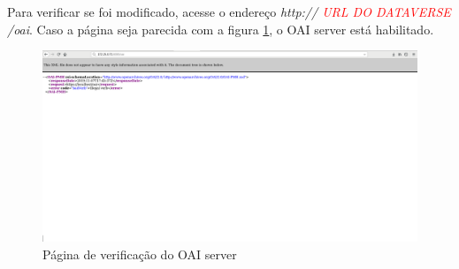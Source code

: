 \documentclass[12pt,hidelinks]{article}
\begin{document}
Para verificar se foi modificado, acesse o endereço \textit{http:// \textcolor{red}{URL DO DATAVERSE} /oai}. Caso a página seja parecida com a figura \ref{img06.png}, o OAI server está habilitado.

\begin{figure}[!htp]
    \centering
      \includegraphics[scale=0.2]{imagens/06.png}
        \caption{Página de verificação do OAI server}
    \label{img06.png}
 \end{figure}
\end{document}
